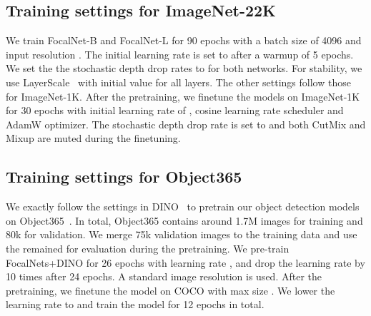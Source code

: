 \documentclass{article}
\begin{document}
\subsection{Training settings for ImageNet-22K}
We train FocalNet-B and FocalNet-L for 90 epochs with a batch size of 4096 and input resolution . The initial learning rate is set to  after a warmup of 5 epochs. We set the the stochastic depth drop rates to  for both networks. For stability, we use LayerScale~\cite{touvron2021going} with initial value  for all layers. The other settings follow those for ImageNet-1K. After the pretraining, we finetune the models on ImageNet-1K for 30 epochs with initial learning rate of , cosine learning rate scheduler and AdamW optimizer. The stochastic depth drop rate is set to  and both CutMix and Mixup are muted during the finetuning.

\subsection{Training settings for Object365}

We exactly follow the settings in DINO~\cite{zhang2022dino} to pretrain our object detection models on Object365~\cite{shao2019objects365}. In total, Object365 contains around 1.7M images for training and 80k for validation. We merge 75k validation images to the training data and use the remained for evaluation during the pretraining. We pre-train FocalNets+DINO for 26 epochs with learning rate , and drop the learning rate by 10 times after 24 epochs. A standard image resolution  is used. After the pretraining, we finetune the model on COCO with max size . We lower the learning rate to  and train the model for 12 epochs in total.
\end{document}
